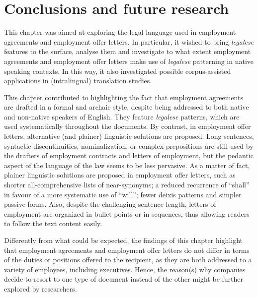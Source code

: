 \documentclass[output=paper]{langscibook}
\begin{document}
\section{Conclusions and future research}\label{sec:giampieri:6}

This chapter was aimed at exploring the legal language used in employment agreements and employment offer letters. In particular, it wished to bring \textit{legalese} features to the surface, analyse them and investigate to what extent employment agreements and employment offer letters make use of \textit{legalese} patterning in native speaking contexts. In this way, it also investigated possible corpus-assisted applications in (intralingual) translation studies.

This chapter contributed to highlighting the fact that employment agreements are drafted in a formal and archaic style, despite being addressed to both native and non-native speakers of English. They feature \textit{legalese} patterns, which are used systematically throughout the documents. By contrast, in employment offer letters, alternative (and plainer) linguistic solutions are proposed. Long sentences, syntactic discontinuities, nominalization, or complex prepositions are still used by the drafters of employment contracts and letters of employment, but the pedantic aspect of the language of the law seems to be less pervasive. As a matter of fact, plainer linguistic solutions are proposed in employment offer letters, such as shorter all-comprehensive lists of near-synonyms; a reduced recurrence of “shall” in favour of a more systematic use of “will”; fewer deixis patterns and simpler passive forms. Also, despite the challenging sentence length, letters of employment are organized in bullet points or in sequences, thus allowing readers to follow the text content easily.

Differently from what could be expected, the findings of this chapter highlight that employment agreements and employment offer letters do not differ in terms of the duties or positions offered to the recipient, as they are both addressed to a variety of employees, including executives. Hence, the reason(s) why companies decide to resort to one type of document instead of the other might be further explored by researchers.
\end{document}

